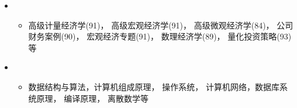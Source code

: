   \begin{itemize}[leftmargin=*]
    \item
      {\small
      \begin{itemize}
        \item{高级计量经济学(91)， 高级宏观经济学(91)， 高级微观经济学(84)， 公司财务案例(90)， 宏观经济专题(91)， 数理经济学(89)， 量化投资策略(93)等}
      \end{itemize}
      }
    \item
      {\small
      \begin{itemize}
        \item{数据结构与算法，计算机组成原理， 操作系统， 计算机网络，数据库系统原理， 编译原理， 离散数学等}
      \end{itemize}
      }
  \end{itemize}